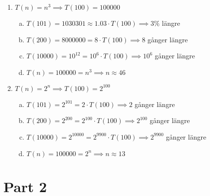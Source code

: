 \documentclass[a4paper]{report}
\begin{document}
\begin{enumerate}
\begin{enumerate}[(a)]
          \end{enumerate}
    \item $T(n) = n^{3} \implies T(100) = 100000$
          \begin{enumerate}[(a)]
              \item $T(101) = 1030301 \approx  1.03 \cdot T(100) \implies 3 \%$ längre
              \item $T(200) = 8000000 = 8 \cdot T(100) \implies 8$ gånger längre
              \item $T(10000) = 10^{12} = 10^{6} \cdot T(100) \implies 10^{6}$ gånger längre
              \item $T(n) = 100000 = n^{3} \implies n \approx  46 $
          \end{enumerate}
    \item $T(n) = 2^{n} \implies T(100) = 2^{100}$
          \begin{enumerate}[(a)]
              \item $T(101) = 2^{101} =  2 \cdot T(100) \implies 2 $ gånger längre
              \item $T(200) = 2^{200} =  2^{100} \cdot T(100) \implies 2^{100} $ gånger längre
              \item $T(10000) = 2^{10000} =  2^{9900} \cdot T(100) \implies 2^{9900} $ gånger längre
              \item $T(n) = 100000 = 2^{n} \implies n \approx  13 $
          \end{enumerate}
\end{enumerate}

\newpage

\section*{Part 2}
\end{document}
